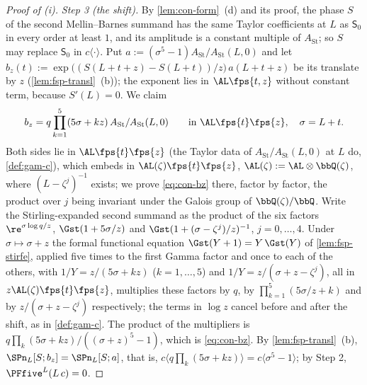 \begin{proof}[Proof of (i)]
\emph{Step 3 (the shift).} By \cref{lem:con-form}~(d) and its proof, the phase $S$ of the second Mellin--Barnes summand has the same Taylor coefficients at $L$ as $\mathsf S_0$ in every order at least $1$, and its amplitude is a constant multiple of $A_{\mathrm{St}}$; so $S$ may replace $\mathsf S_0$ in $c\langle\cdot\rangle$. Put $a:=(\sigma^5-1)A_{\mathrm{St}}/A_{\mathrm{St}}(L,0)$ and let $b_z(t):=\exp\bigl((S(L+t+z)-S(L+t))/z\bigr)\,a(L+t+z)$ be its translate by $z$ (\cref{lem:fsp-transl}~(b)); the exponent lies in $\AL\fps{t,z}$ without constant term, because $S'(L)=0$. We claim
\begin{equation}
\label{eq:con-bz}
b_z=q\prod_{k=1}^5(5\sigma+kz)\,A_{\mathrm{St}}/A_{\mathrm{St}}(L,0)\qquad\text{in }\AL\fps{t}\fps{z},\quad\sigma=L+t .
\end{equation}
Both sides lie in $\AL\fps{t}\fps{z}$ (the Taylor data of $A_{\mathrm{St}}/A_{\mathrm{St}}(L,0)$ at $L$ do, \cref{def:gam-c}), which embeds in $\AL(\zeta)\fps{t}\fps{z}$, $\AL(\zeta):=\AL\otimes\bbQ(\zeta)$, where $(L-\zeta^j)^{-1}$ exists; we prove \eqref{eq:con-bz} there, factor by factor, the product over $j$ being invariant under the Galois group of $\bbQ(\zeta)/\bbQ$. Write the Stirling-expanded second summand as the product of the six factors $\re^{\sigma\log q/z}$, $\Gst(1+5\sigma/z)$ and $\Gst(1+(\sigma-\zeta^j)/z)^{-1}$, $j=0,\dots,4$. Under $\sigma\mapsto\sigma+z$ the formal functional equation $\Gst(Y+1)=Y\,\Gst(Y)$ of \cref{lem:fsp-stirfe}, applied five times to the first Gamma factor and once to each of the others, with $1/Y=z/(5\sigma+kz)$ ($k=1,\dots,5$) and $1/Y=z/(\sigma+z-\zeta^j)$, all in $z\AL(\zeta)\fps{t}\fps{z}$, multiplies these factors by $q$, by $\prod_{k=1}^5(5\sigma/z+k)$ and by $z/(\sigma+z-\zeta^j)$ respectively; the terms in $\log z$ cancel before and after the shift, as in \cref{def:gam-c}. The product of the multipliers is $q\prod_k(5\sigma+kz)/((\sigma+z)^5-1)$, which is \eqref{eq:con-bz}. By \cref{lem:fsp-transl}~(b), $\SPn_L[S;b_z]=\SPn_L[S;a]$, that is, $c\langle q\prod_k(5\sigma+kz)\rangle=c\langle\sigma^5-1\rangle$; by Step 2, $\PFfive^{L}(L\,c)=0$.
\end{proof}


